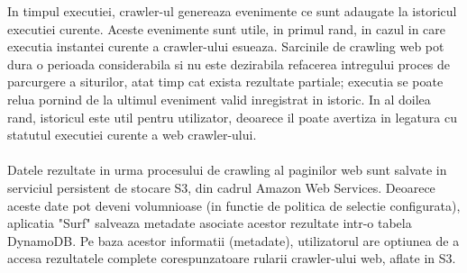In timpul executiei, crawler-ul genereaza evenimente ce sunt adaugate la istoricul executiei curente. Aceste evenimente sunt utile, in primul rand, in cazul in care executia instantei curente a crawler-ului esueaza. Sarcinile de crawling web pot dura o perioada considerabila si nu este dezirabila refacerea intregului proces de parcurgere a siturilor, atat timp cat exista rezultate partiale; executia se poate relua pornind de la ultimul eveniment valid inregistrat in istoric.  In al doilea rand, istoricul este util pentru utilizator, deoarece il poate avertiza in legatura cu statutul executiei curente a web crawler-ului.
\\
\\
Datele rezultate in urma procesului de crawling al paginilor web sunt salvate in serviciul persistent de stocare S3, din cadrul Amazon Web Services. Deoarece aceste date pot deveni volumnioase (in functie de politica de selectie configurata), aplicatia "Surf" salveaza metadate asociate acestor rezultate intr-o tabela DynamoDB. Pe baza acestor informatii (metadate), utilizatorul are optiunea de a accesa rezultatele complete corespunzatoare rularii crawler-ului web, aflate in S3.